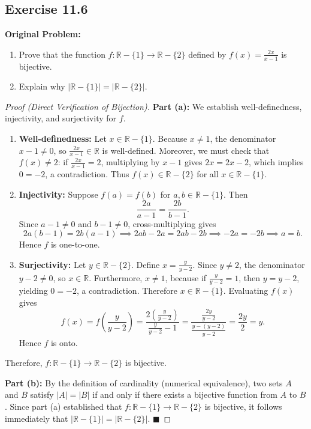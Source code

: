 \documentclass[11pt, letterpaper]{article}
\theoremstyle{definition}
\theoremstyle{remark}
\begin{document}
\subsection*{Exercise 11.6}
\textbf{Original Problem:}
\begin{enumerate}[label=(\alph*)]
    \item Prove that the function $f : \mathbb{R} - \{1\} \to \mathbb{R} - \{2\}$ defined by $f(x) = \frac{2x}{x-1}$ is bijective.
    \item Explain why $|\mathbb{R} - \{1\}| = |\mathbb{R} - \{2\}|$.
\end{enumerate}

\begin{proof}[Proof (Direct Verification of Bijection)]
\textbf{Part (a):} We establish well-definedness, injectivity, and surjectivity for $f$.
\begin{enumerate}[label=(\arabic*)]
    \item \textbf{Well-definedness:} Let $x \in \mathbb{R} - \{1\}$. Because $x \neq 1$, the denominator $x - 1 \neq 0$, so $\frac{2x}{x-1} \in \mathbb{R}$ is well-defined. Moreover, we must check that $f(x) \neq 2$: if $\frac{2x}{x-1} = 2$, multiplying by $x - 1$ gives $2x = 2x - 2$, which implies $0 = -2$, a contradiction. Thus $f(x) \in \mathbb{R} - \{2\}$ for all $x \in \mathbb{R} - \{1\}$.
    
    \item \textbf{Injectivity:} Suppose $f(a) = f(b)$ for $a, b \in \mathbb{R} - \{1\}$. Then
    \[
    \frac{2a}{a - 1} = \frac{2b}{b - 1}.
    \]
    Since $a - 1 \neq 0$ and $b - 1 \neq 0$, cross-multiplying gives
    \[
    2a(b - 1) = 2b(a - 1) \implies 2ab - 2a = 2ab - 2b \implies -2a = -2b \implies a = b.
    \]
    Hence $f$ is one-to-one.
    
    \item \textbf{Surjectivity:} Let $y \in \mathbb{R} - \{2\}$. Define $x = \frac{y}{y - 2}$. Since $y \neq 2$, the denominator $y - 2 \neq 0$, so $x \in \mathbb{R}$. Furthermore, $x \neq 1$, because if $\frac{y}{y - 2} = 1$, then $y = y - 2$, yielding $0 = -2$, a contradiction. Therefore $x \in \mathbb{R} - \{1\}$. Evaluating $f(x)$ gives
    \[
    f(x) = f\left(\frac{y}{y - 2}\right) = \frac{2\left(\frac{y}{y - 2}\right)}{\frac{y}{y - 2} - 1} = \frac{\frac{2y}{y - 2}}{\frac{y - (y - 2)}{y - 2}} = \frac{2y}{2} = y.
    \]
    Hence $f$ is onto.
\end{enumerate}
Therefore, $f : \mathbb{R} - \{1\} \to \mathbb{R} - \{2\}$ is bijective.

\textbf{Part (b):} By the definition of cardinality (numerical equivalence), two sets $A$ and $B$ satisfy $|A| = |B|$ if and only if there exists a bijective function from $A$ to $B$. Since part (a) established that $f : \mathbb{R} - \{1\} \to \mathbb{R} - \{2\}$ is bijective, it follows immediately that $|\mathbb{R} - \{1\}| = |\mathbb{R} - \{2\}|$. $\blacksquare$
\end{proof}
\end{document}
